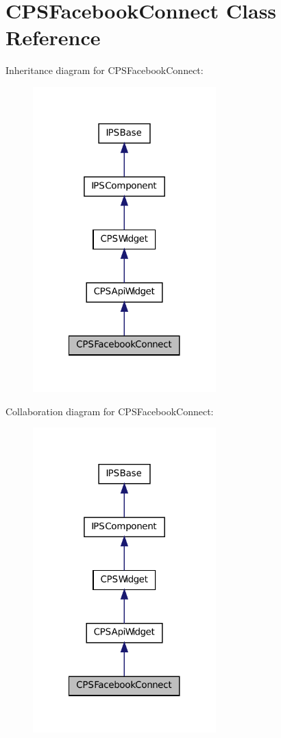 \hypertarget{classCPSFacebookConnect}{
\section{CPSFacebookConnect Class Reference}
\label{classCPSFacebookConnect}
}


Inheritance diagram for CPSFacebookConnect:\nopagebreak
\begin{figure}[H]
\begin{center}
\leavevmode
\includegraphics[width=200pt]{classCPSFacebookConnect__inherit__graph}
\end{center}
\end{figure}


Collaboration diagram for CPSFacebookConnect:\nopagebreak
\begin{figure}[H]
\begin{center}
\leavevmode
\includegraphics[width=200pt]{classCPSFacebookConnect__coll__graph}
\end{center}
\end{figure}
